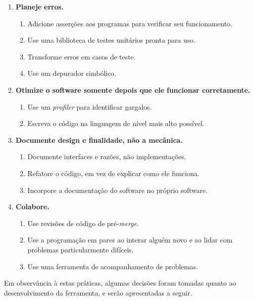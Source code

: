 \begin{tcolorbox}
\begin{enumerate}
\item \textbf{Planeje erros.}
    \begin{enumerate}
        \item Adicione asserções aos programas para verificar seu funcionamento.
        \item Use uma biblioteca de testes unitários pronta para uso.
        \item Transforme erros em casos de teste.
        \item Use um depurador simbólico.
    \end{enumerate}

\item \textbf{Otimize o software somente depois que ele funcionar corretamente.}
    \begin{enumerate}
        \item Use um \textit{profiler} para identificar gargalos.
        \item Escreva o código na linguagem de nível mais alto possível.
    \end{enumerate}

\item \textbf{Documente design e finalidade, não a mecânica.}
    \begin{enumerate}
        \item Documente interfaces e razões, não implementações.
        \item Refatore o código, em vez de explicar como ele funciona.
        \item Incorpore a documentação do software no próprio software.
    \end{enumerate}

\item \textbf{Colabore.}
    \begin{enumerate}
        \item Use revisões de código de pré-\textit{merge}.
        \item Use a programação em pares ao interar alguém novo e ao lidar com problemas particularmente difíceis.
        \item Use uma ferramenta de acompanhamento de problemas.
    \end{enumerate}
\end{enumerate}
\end{tcolorbox}

Em observância à estas práticas, algumas decisões foram tomadas quanto ao desenvolvimento da ferramenta, e serão apresentadas a seguir.


